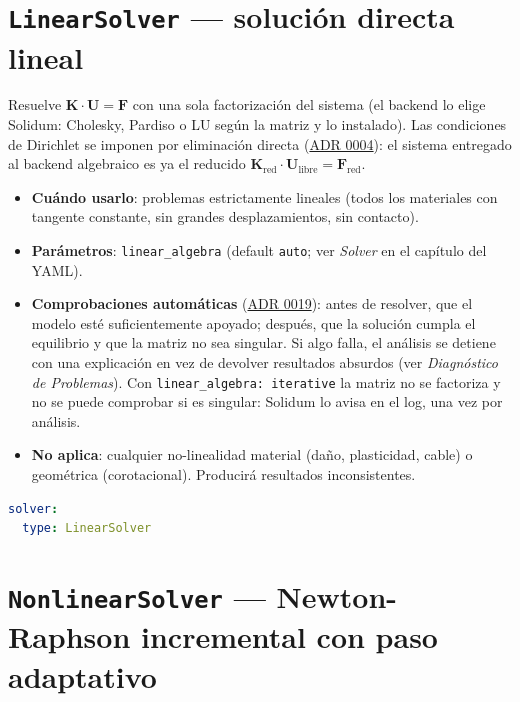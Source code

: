 \documentclass[11pt,oneside]{report}
\begin{document}
\section{\texttt{LinearSolver} --- solución directa lineal}

Resuelve $\mathbf K \cdot \mathbf U = \mathbf F$ con una sola factorización del sistema (el backend lo elige Solidum: Cholesky, Pardiso o LU según la matriz y lo instalado). Las condiciones de Dirichlet se imponen por eliminación directa (\href{https://github.com/jretamav/solidum-fem/blob/main/docs/adr/0004-imposicion-de-condiciones-de-dirichlet.md}{ADR 0004}): el sistema entregado al backend algebraico es ya el reducido $\mathbf K_{\text{red}} \cdot \mathbf U_{\text{libre}} = \mathbf F_{\text{red}}$.

\begin{itemize}
  \item \textbf{Cuándo usarlo}: problemas estrictamente lineales (todos los materiales con tangente constante, sin grandes desplazamientos, sin contacto).
  \item \textbf{Parámetros}: \texttt{linear\_algebra} (default \texttt{auto}; ver \textit{Solver} en el capítulo del YAML).
  \item \textbf{Comprobaciones automáticas} (\href{https://github.com/jretamav/solidum-fem/blob/main/docs/adr/0019-red-de-seguridad-analisis-estatico.md}{ADR 0019}): antes de resolver, que el modelo esté suficientemente apoyado; después, que la solución cumpla el equilibrio y que la matriz no sea singular. Si algo falla, el análisis se detiene con una explicación en vez de devolver resultados absurdos (ver \textit{Diagnóstico de Problemas}). Con \texttt{linear\_\allowbreak{}algebra: iterative} la matriz no se factoriza y no se puede comprobar si es singular: Solidum lo avisa en el log, una vez por análisis.
  \item \textbf{No aplica}: cualquier no-linealidad material (daño, plasticidad, cable) o geométrica (corotacional). Producirá resultados inconsistentes.
\end{itemize}

\begin{lstlisting}[language=yaml]
solver:
  type: LinearSolver

\end{lstlisting}

\section{\texttt{NonlinearSolver} --- Newton-Raphson incremental con paso adaptativo}
\end{document}
